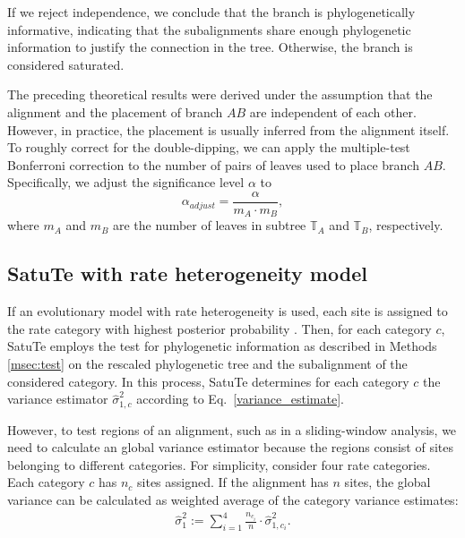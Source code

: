 \medskip

If we reject independence, we conclude that the branch is phylogenetically informative, indicating that the subalignments share enough phylogenetic information to justify the connection in the tree. Otherwise, the branch is considered saturated. 


\medskip

The preceding theoretical results were derived under the assumption that the alignment and the placement of branch $AB$ are independent of each other. However, in practice, the placement is usually inferred from the alignment itself. To roughly correct for the double-dipping, we can apply the multiple-test Bonferroni correction to the number of pairs of leaves used to place branch $AB$. Specifically, we adjust the significance level $\alpha$ to \begin{equation} \label{eq:corrected_significance}
\alpha_{adjust} =  \frac{\alpha}{m_A\cdot m_B}, 
\end{equation}
where $m_A$ and $m_B$ are the number of leaves in subtree  $\mathbb{T}_A$ and $\mathbb{T}_B$, respectively. 

\bigskip

\subsection{SatuTe with rate heterogeneity model}\label{msec:hetero}

If an evolutionary model with rate heterogeneity is used, each site is assigned to the rate category with highest posterior probability . Then, for each category $c$, SatuTe employs the test for phylogenetic information as described in Methods \ref{msec:test} on the rescaled phylogenetic tree  and the subalignment of the considered category. In this process, SatuTe determines for each category $c$  the variance estimator $\hat\sigma^2_{1,c}$ according to Eq.\, \eqref{variance_estimate}.

\medskip 

However, to  test  regions of  an alignment, such as in a sliding-window analysis, we need to calculate an global variance estimator because the regions consist of  sites belonging  to different categories. For simplicity, consider four rate categories. Each category $c$ has $n_c$ sites assigned. If the alignment has $n$ sites, the global variance can be calculated as weighted average of the category variance estimates:
\begin{align}\label{eq:global_variance}
\hat\sigma_1^2 := \sum_{ i= 1}^4\frac{n_{c_i}}{n}\cdot \hat\sigma^2_{1,{c_i}}.
\end{align}

